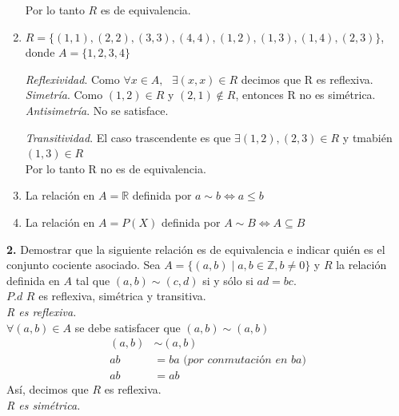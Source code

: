 \documentclass[12pt]{article}
\begin{document}
\begin{enumerate}[label=\alph*)]
    Por lo tanto $R$ es de equivalencia.

    \item $R = \{(1,1),(2,2),(3,3),(4,4),(1,2),(1,3),(1,4),(2,3)\}$, donde $A = \{1,2,3,4\}$

    \textit{Reflexividad}. Como $\forall x \in A, \text{ } \exists (x,x) \in R$ decimos que R es reflexiva.\\ 

    \textit{Simetría}. Como $(1,2) \in R$  y $(2,1) \notin R$, entonces R no es simétrica.\\

    \textit{Antisimetría}. No se satisface.

    \textit{Transitividad}. El caso trascendente es que $\exists (1,2), (2,3) \in R$ y tmabién $(1,3) \in R$\\

    Por lo tanto R no es de equivalencia.\\

    \item La relación en $A = \mathbb{R}$ definida por $a \sim b \Longleftrightarrow a \leq b$
    \item La relación en $A = P(X)$ definida por $A \sim B \Longleftrightarrow A \subseteq B$
\end{enumerate}

\vspace{0.5cm}
%
%
\textbf{2.} Demostrar que la siguiente relación es de equivalencia e indicar quién es el conjunto cociente asociado. 
Sea $A = \{(a, b) \mid a, b \in \mathbb{Z}, b \neq 0\}$ y $R$ la relación definida en $A$ tal que $(a, b) \sim (c, d)$ si y sólo si $ad = bc$.\\

$P.d$ $R$ es reflexiva, simétrica y transitiva.\\

\textit{R es reflexiva.}\\

$\forall (a, b) \in A$ se debe satisfacer que $(a, b) \sim (a, b)$
\begin{align*}
    (a, b) &\sim (a, b)\\
    ab &= ba \textit{ (por conmutación en ba)}\\
    ab &= ab
\end{align*}
Así, decimos que $R$ es reflexiva.\\

\textit{R es simétrica.}\\
\end{document}
